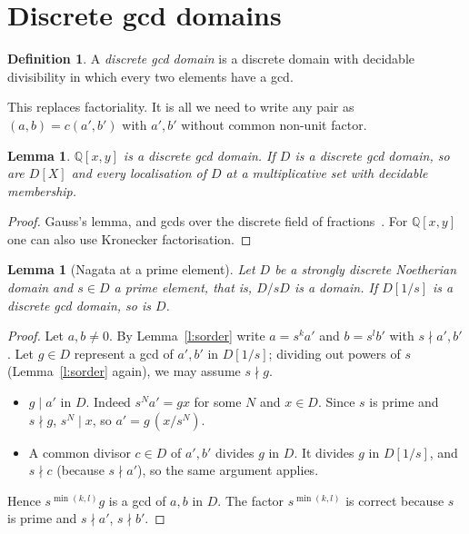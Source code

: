 \documentclass[11pt]{article}
\newcommand{\Q}{\mathbb{Q}}
\numberwithin{equation}{section}
\theoremstyle{plain}
\newtheorem{lemma}[theorem]{Lemma}
\theoremstyle{definition}
\newtheorem{definition}[theorem]{Definition}
\theoremstyle{remark}
\begin{document}
\section{Discrete gcd domains}\label{s:gcd}

\begin{definition}
A \emph{discrete gcd domain} is a discrete domain with decidable divisibility in which every two
elements have a gcd.
\end{definition}

This replaces factoriality. It is all we need to write any pair as $(a,b)=c(a',b')$ with $a',b'$
without common non-unit factor.

\begin{lemma}\label{l:poly}
$\Q[x,y]$ is a discrete gcd domain. If $D$ is a discrete gcd domain, so are $D[X]$ and every
localisation of $D$ at a multiplicative set with decidable membership.
\end{lemma}

\begin{proof}
Gauss's lemma, and gcds over the discrete field of fractions~\cite[III]{LQ}. For $\Q[x,y]$ one can
also use Kronecker factorisation.
\end{proof}

\begin{lemma}[Nagata at a prime element]\label{l:nagata}
Let $D$ be a strongly discrete Noetherian domain and $s\in D$ a prime element, that is,
$D/sD$ is a domain. If $D[1/s]$ is a discrete gcd domain, so is $D$.
\end{lemma}

\begin{proof}
Let $a,b\ne0$. By Lemma~\ref{l:sorder} write $a=s^ka'$ and $b=s^lb'$ with $s\nmid a',b'$. Let
$g\in D$ represent a gcd of $a',b'$ in $D[1/s]$; dividing out powers of $s$ (Lemma~\ref{l:sorder}
again), we may assume $s\nmid g$.
\begin{itemize}
\item $g\mid a'$ in $D$. Indeed $s^Na'=gx$ for some $N$ and $x\in D$. Since $s$ is prime and
  $s\nmid g$, $s^N\mid x$, so $a'=g\,(x/s^N)$.
\item A common divisor $c\in D$ of $a',b'$ divides $g$ in $D$. It divides $g$ in $D[1/s]$, and
  $s\nmid c$ (because $s\nmid a'$), so the same argument applies.
\end{itemize}
Hence $s^{\min(k,l)}g$ is a gcd of $a,b$ in $D$. The factor $s^{\min(k,l)}$ is correct because $s$
is prime and $s\nmid a'$, $s\nmid b'$.
\end{proof}
\end{document}
